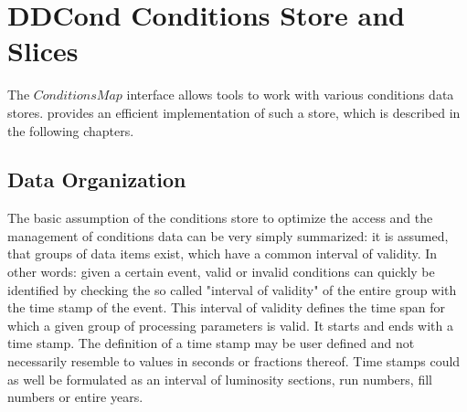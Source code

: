 \documentclass[10pt,a4paper]{article}
\begin{document}
\newpage
\section{DDCond Conditions Store and Slices}
\label{subsec:ddcond-conditions-store}

\noindent
The $ConditionsMap$ interface allows tools to work with various conditions 
data stores. \DDC provides an efficient implementation of such a store,
which is described in the following chapters.

\subsection{Data Organization}
\label{subsec:ddcond-internal-data-organization}

\noindent
The basic assumption of the \DDC conditions store to optimize the access 
and the management of conditions
data can be very simply summarized: it is assumed, that groups of data items
exist, which have a common interval of validity. In other words: given a 
certain event, valid or invalid conditions can quickly be identified by 
checking the so called "interval of validity" of the entire group with the
time stamp of the event. This interval of validity defines the time span
for which a given group of processing parameters is valid. It starts and 
ends with a time stamp. The definition of a time stamp may be user defined 
and not necessarily resemble to values in seconds or fractions thereof. 
Time stamps could as well be formulated as an interval of luminosity sections,
run numbers, fill numbers or entire years. 
\end{document}
